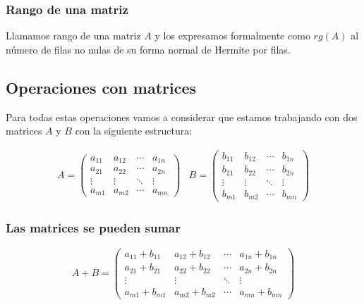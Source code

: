 \subsubsection{Rango de una matriz}

Llamamos rango de una matriz $A$ y los expresamos formalmente como $rg(A)$ al número de filas no nulas de su forma normal de Hermite por filas.

\subsection{Operaciones con matrices}\label{operaciones-con-matrices}

Para todas estas operaciones vamos a considerar que estamos trabajando con dos matrices $A$ y $B$ con la siguiente estructura:

\[
	\begin{array}{cc}
		A =
		\begin{pmatrix}
			a_{11} & a_{12} & \cdots & a_{1n} \\
			a_{21} & a_{22} & \cdots & a_{2n} \\
			\vdots & \vdots & \ddots & \vdots \\
			a_{m1} & a_{m2} & \cdots & a_{mn}
		\end{pmatrix}

		&

		B =
		\begin{pmatrix}
			b_{11} & b_{12} & \cdots & b_{1n} \\
			b_{21} & b_{22} & \cdots & b_{2n} \\
			\vdots & \vdots & \ddots & \vdots \\
			b_{m1} & b_{m2} & \cdots & b_{mn}
		\end{pmatrix}
	\end{array}
\]

\subsubsection{Las matrices se pueden sumar}

\[
	A+B =
	\begin{pmatrix}
		a_{11} + b_{11} & a_{12} + b_{12} & \cdots & a_{1n} + b_{1n} \\
		a_{21} + b_{21} & a_{22} + b_{22} & \cdots & a_{2n} + b_{2n} \\
		\vdots          & \vdots          & \ddots & \vdots          \\
		a_{m1} + b_{m1} & a_{m2} + b_{m2} & \cdots & a_{mn} + b_{mn}
	\end{pmatrix}
\]

